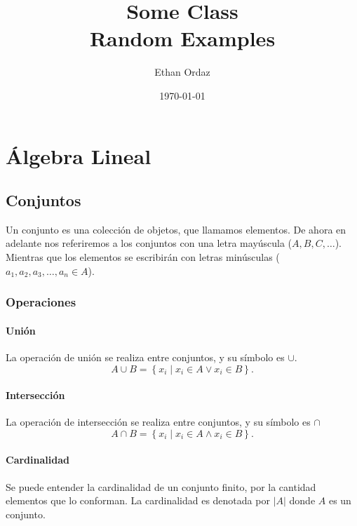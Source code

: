 \documentclass{report}
\title{\Huge{Some Class}\\Random Examples}
\author{\huge{Ethan Ordaz}}
\date{\today}
\begin{document}
\maketitle
\newpage%
\tableofcontents
\pagebreak

\chapter{Álgebra Lineal}
\section{Conjuntos}
Un conjunto es una colección de objetos, que llamamos elementos. De ahora en adelante nos referiremos a los conjuntos con una letra mayúscula ($A,B,C,\ldots $). Mientras que los elementos se escribirán con letras minúsculas ($a_1, a_2, a_3, \ldots, a_n \in A$).
\subsection{Operaciones}
\subsubsection{Unión}
La operación de unión se realiza entre conjuntos, y su símbolo es $\cup$.
\[ 
	A \cup B = \left\{x_i \mid x_i \in A \lor x_i \in B \right\}
.\]
\subsubsection{Intersección}
La operación de intersección se realiza entre conjuntos, y su símbolo es $\cap$
\[ 
	A \cap B = \left\{x_i \mid x_i \in A \land x_i \in B \right\}
.\]
\subsubsection{Cardinalidad}
Se puede entender la cardinalidad de un conjunto finito, por la cantidad elementos que lo conforman. La cardinalidad es denotada por $|A|$ donde $A$ es un conjunto.
\end{document}
